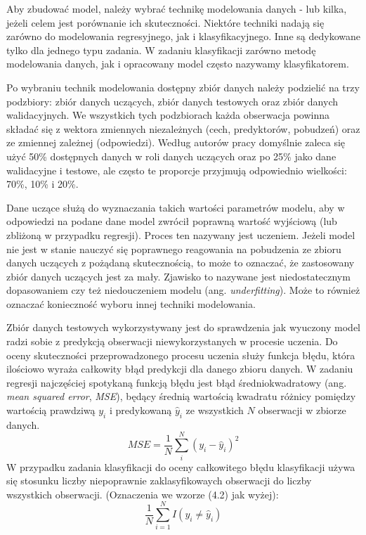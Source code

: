 \documentclass[notitlepage]{report}
\begin{document}
Aby zbudować model, należy wybrać technikę modelowania danych - lub kilka, jeżeli celem jest porównanie ich skuteczności. Niektóre techniki nadają się zarówno do modelowania regresyjnego, jak i klasyfikacyjnego. Inne są dedykowane tylko dla jednego typu zadania. W zadaniu klasyfikacji zarówno metodę modelowania danych, jak i opracowany model często nazywamy klasyfikatorem. 

Po wybraniu technik modelowania dostępny zbiór danych należy podzielić na trzy podzbiory: zbiór danych uczących, zbiór danych testowych oraz zbiór danych walidacyjnych. We wszystkich tych podzbiorach każda obserwacja powinna składać się z wektora zmiennych niezależnych (cech, predyktorów, pobudzeń) oraz ze zmiennej zależnej (odpowiedzi). Według autorów pracy \cite{eslii} domyślnie zaleca się użyć 50\% dostępnych danych w roli danych uczących oraz po 25\% jako dane walidacyjne i testowe, ale często te proporcje przyjmują odpowiednio wielkości: 70\%, 10\% i 20\%. 

Dane uczące służą do wyznaczania takich wartości parametrów modelu, aby w odpowiedzi na podane dane model zwrócił poprawną wartość wyjściową (lub zbliżoną w przypadku regresji). Proces ten nazywany jest uczeniem. Jeżeli model nie jest w stanie nauczyć się poprawnego reagowania na pobudzenia ze zbioru danych uczących z pożądaną skutecznością, to może to oznaczać, że zastosowany zbiór danych uczących jest za mały. Zjawisko to nazywane jest niedostatecznym dopasowaniem czy też niedouczeniem modelu (ang. \textit{underfitting}). Może to również oznaczać konieczność wyboru innej techniki modelowania. 

Zbiór danych testowych wykorzystywany jest do sprawdzenia jak wyuczony model radzi sobie z predykcją obserwacji niewykorzystanych w procesie uczenia.
Do oceny skuteczności przeprowadzonego procesu uczenia służy funkcja błędu, która ilościowo wyraża całkowity błąd predykcji dla danego zbioru danych. W zadaniu regresji najczęściej spotykaną funkcją błędu jest błąd średniokwadratowy (ang. \textit{mean squared error}, \textit{MSE}), będący średnią wartością kwadratu różnicy pomiędzy wartością prawdziwą $y_i$ i predykowaną $\hat{y}_i$ ze wszystkich $N$ obserwacji w zbiorze danych. 
\begin{equation}
MSE = \frac{1}{N}\sum_{i}^{N}(y_i - \hat{y}_i)^2
\end{equation}
W przypadku zadania klasyfikacji do oceny całkowitego błędu klasyfikacji używa się stosunku liczby niepoprawnie zaklasyfikowaych obserwacji do liczby wszystkich obserwacji. (Oznaczenia we wzorze (4.2) jak wyżej):
\begin{equation}
\frac{1}{N}\sum_{i=1}^{N}I(y_i \neq \hat{y}_i) 
\end{equation}
\end{document}

